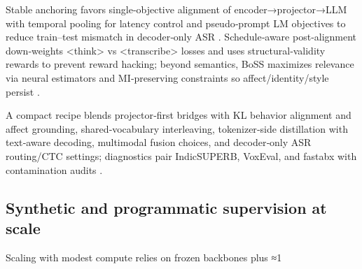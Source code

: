 Stable anchoring favors single‑objective alignment of encoder→projector→LLM with temporal pooling for latency control and pseudo‑prompt LM objectives to reduce train–test mismatch in decoder‑only ASR \cite{nguyen2025qwenvsgemmaintegrationwhispercomparative,tsunoo2024decoderonlyarchitecturespeechrecognition}. Schedule‑aware post‑alignment down‑weights <think> vs <transcribe> losses and uses structural‑validity rewards to prevent reward hacking; beyond semantics, BoSS maximizes relevance via neural estimators and MI‑preserving constraints so affect/identity/style persist \cite{li2025seewossubmissionmlcslmlessonslearnedspee,wang2025bossbeyondsemanticspeech}.

A compact recipe blends projector‑first bridges with KL behavior alignment and affect grounding, shared‑vocabulary interleaving, tokenizer‑side distillation with text‑aware decoding, multimodal fusion choices, and decoder‑only ASR routing/CTC settings; diagnostics pair IndicSUPERB, VoxEval, and fastabx with contamination audits \cite{nguyen2025qwenvsgemmaintegrationwhispercomparative,wang2024blspemotowardsempatheticlargespeechlangu,zeng2024scalingspeechtextpretrainingsyntheticint,ahasan2025dmcodecdistillingmultimodalrepresentatio,wang2025tadicodectextawarediffusionspeechtokeniz,sadok2025vectorquantizedmaskedautoencoderaudiovis,tsunoo2024decoderonlyarchitecturespeechrecognition,li2025seewossubmissionmlcslmlessonslearnedspee,wang2025bossbeyondsemanticspeech,entry2025indicsuperbspeechprocessinguniversalperf,turetzky2024lastlanguagemodelawarespeechtokenization,cui2025voxevalbenchmarkingknowledgeunderstandin,tseng2025evaluationllmsspeechisoftenflawedtestset}.

\subsection{Synthetic and programmatic supervision at scale} \label{subsec:Synthetic and programmatic supervision at scale}
Scaling with modest compute relies on frozen backbones plus ≈1%


